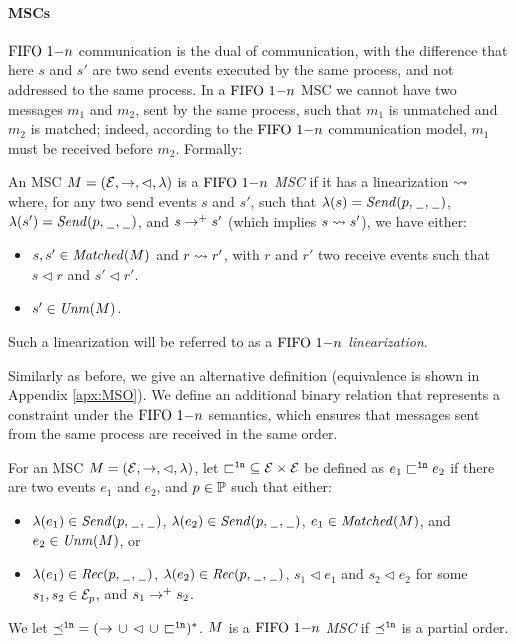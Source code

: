 \paragraph{\bf \onen MSCs}
 $\text{FIFO } 1\mathsf{-}n$ communication is the dual of \mb communication, with the difference that here $s$ and $s'$ are two send events executed by the same process, and not addressed to the same process. In a $\text{FIFO } 1\mathsf{-}n$ MSC we cannot have two messages $m_1$ and $m_2$, sent by the same process, such that $m_1$ is unmatched and $m_2$ is matched; indeed, according to the $\text{FIFO } 1\mathsf{-}n$ communication model, $m_1$ must be received before $m_2$.
Formally:
\begin{definition}\label{def:one_n}
An MSC $M = (\mathcal{E},\to,\lhd,\lambda)$ is a \emph{$\text{FIFO } 1\mathsf{-}n$ MSC} if it has a linearization $\rightsquigarrow$ where, for any two send events $s$ and $s'$, such that $\lambda(s)={\mathit{Send}(p,\hspace{0.1em}\underline{\hspace{0.5em}}\hspace{0.1em},\hspace{0.1em}\underline{\hspace{0.5em}}\hspace{0.1em})}$, $\lambda(s')={\mathit{Send}(p,\hspace{0.1em}\underline{\hspace{0.5em}}\hspace{0.1em},\hspace{0.1em}\underline{\hspace{0.5em}}\hspace{0.1em})}$, and $s \to^+ s'$ (which implies $s \rightsquigarrow s'$), we have either:
\begin{itemize}%
	\item $s,s' \in \mathit{Matched}(M)$ and $r \rightsquigarrow r'$, with  $r$ and $r'$  two receive events such that $s \lhd r$ and $s' \lhd r'$.
	\item $s' \in \mathit{Unm}(M)$.
\end{itemize}
\end{definition}

Such a linearization will be referred to as a \emph{$\text{FIFO } 1\mathsf{-}n$ linearization}. 

Similarly as before, we give an alternative definition (equivalence is shown in Appendix \ref{apx:MSO}). We define
	an additional binary relation that represents a constraint
	under the $\text{FIFO } 1\mathsf{-}n$ semantics, which ensures that messages sent from the same process are received in the same order. 

\begin{definition} \label{def:one_n_alt}
	For an MSC $M = (\mathcal{E},\to,\lhd,\lambda)$, let ${\sqsubset^{\mathtt{1n}}} \subseteq \mathcal{E} \times \mathcal{E}$ be defined as $e_1 \sqsubset^{\mathtt{1n}} e_2$ if there are two events $e_1$ and $e_2$, and $p \in \mathbb{P}$ such that either:
	\begin{itemize}%
		\item $\lambda(e_1) \in {\mathit{Send}(p,\hspace{0.1em}\underline{\hspace{0.5em}}\hspace{0.1em},\hspace{0.1em}\underline{\hspace{0.5em}}\hspace{0.1em})}$, $\lambda(e_2) \in {\mathit{Send}(p,\hspace{0.1em}\underline{\hspace{0.5em}}\hspace{0.1em},\hspace{0.1em}\underline{\hspace{0.5em}}\hspace{0.1em})}$, $e_1 \in \mathit{Matched}(M)$, and $e_2 \in \mathit{Unm}(M)$, or
		\item $\lambda(e_1) \in {\mathit{Rec}(p,\hspace{0.1em}\underline{\hspace{0.5em}}\hspace{0.1em},\hspace{0.1em}\underline{\hspace{0.5em}}\hspace{0.1em})}$, $\lambda(e_2) \in {\mathit{Rec}(p,\hspace{0.1em}\underline{\hspace{0.5em}}\hspace{0.1em},\hspace{0.1em}\underline{\hspace{0.5em}}\hspace{0.1em})}$, $s_1 \lhd e_1$ and $s_2 \lhd e_2$ for some $s_1,s_2 \in \mathcal{E}_p$, and $s_1 \to^+ s_2$.
	\end{itemize}
	
	We let ${\preceq^{\mathtt{1n}}} = ({\to} \,\cup\, {\lhd} \,\cup\, {\sqsubset^{\mathtt{1n}}})^\ast$.
	$M$ is a \emph{$\text{FIFO } 1\mathsf{-}n$ MSC}
	if ${\preceq^{\mathtt{1n}}}$ is a partial order. 
\end{definition}

